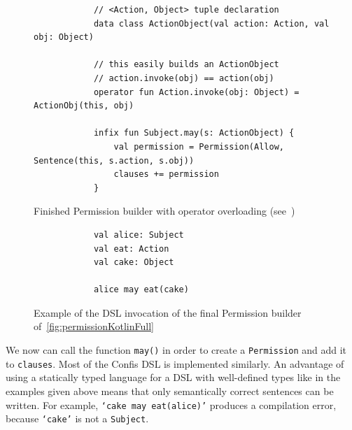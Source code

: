 \begin{figure}[h]
    \centering
    \begin{minipage}{\textwidth}
        \begin{verbatim}
            // <Action, Object> tuple declaration
            data class ActionObject(val action: Action, val obj: Object)

            // this easily builds an ActionObject
            // action.invoke(obj) == action(obj)
            operator fun Action.invoke(obj: Object) = ActionObj(this, obj)

            infix fun Subject.may(s: ActionObject) {
                val permission = Permission(Allow, Sentence(this, s.action, s.obj))
                clauses += permission
            }
        \end{verbatim}
    \end{minipage}
    \caption[Finished Permission builder]{Finished Permission builder with operator overloading (see~\cite{kotlinInvokeOperator})}
    \label{fig:permissionKotlinFull}
\end{figure}



\begin{figure}[h]
    \centering
    \begin{minipage}{0.5\textwidth}
        \begin{verbatim}
            val alice: Subject
            val eat: Action
            val cake: Object

            alice may eat(cake)
        \end{verbatim}
    \end{minipage}
    \caption{Example of the DSL invocation of the final Permission builder of~\autoref{fig:permissionKotlinFull}}
    \label{fig:finalPermissionInvocationDSL}
\end{figure}

We now can call the function \texttt{may()} in order to create a \texttt{Permission} and add it to \texttt{clauses}.
Most of the Confis DSL is implemented similarly.
An advantage of using a statically typed language for a DSL with well-defined types like in the examples given above means that only semantically correct sentences can be written.
For example, \texttt{`cake may eat(alice)'} produces a compilation error, because \texttt{`cake'} is not a \texttt{Subject}.


